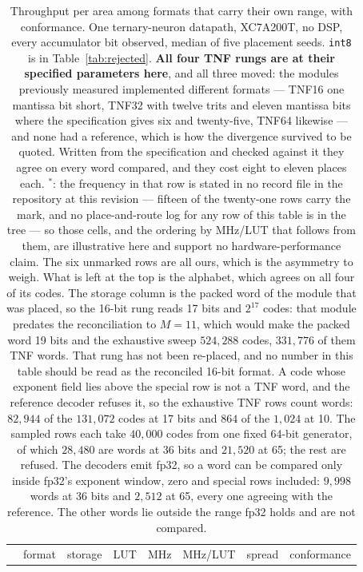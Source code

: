 \begin{table}[t]\centering
\caption{Throughput per area among formats that carry their own range, with
conformance. One ternary-neuron datapath, XC7A200T, no DSP, every accumulator
bit observed, median of five placement seeds. \texttt{int8} is in
Table~\ref{tab:rejected}. \textbf{All four TNF rungs are at their specified
parameters here}, and all three moved: the modules previously measured
implemented different formats --- TNF16 one mantissa bit short, TNF32 with twelve
trits and eleven mantissa bits where the specification gives six and
twenty-five, TNF64 likewise --- and none had a reference, which is how the
divergence survived to be quoted. Written from the specification and checked
against it they agree on every word compared, and they cost eight to eleven places
each. $^{\ast}$: the frequency in that row is stated in no record file in the
repository at this revision --- fifteen of the twenty-one rows carry the mark, and
no place-and-route log for any row of this table is in the tree --- so those cells,
and the ordering by MHz/LUT that follows from them, are illustrative here and
support no hardware-performance claim. The six unmarked rows are all ours, which
is the asymmetry to weigh. What is left at the top is the alphabet, which agrees on all four of its
codes. The storage column is the packed word of the module that was placed, so the
16-bit rung reads 17 bits and $2^{17}$ codes: that module predates the
reconciliation to $M = 11$, which would make the packed word 19 bits and the
exhaustive sweep $524{,}288$ codes, $331{,}776$ of them TNF words. That rung has
not been re-placed, and no number in this table should be read as the reconciled
16-bit format. A code whose exponent field lies above the special row is not a
TNF word, and the reference decoder refuses it, so the exhaustive TNF rows count
words: $82{,}944$ of the $131{,}072$ codes at 17 bits and $864$ of the $1{,}024$ at
10. The sampled rows each take $40{,}000$ codes from one fixed 64-bit generator, of which $28{,}480$ are words at 36 bits and $21{,}520$ at 65; the rest are refused. The decoders emit fp32, so a word can be compared only inside fp32's exponent window, zero and special rows included: $9{,}998$ words at 36 bits and $2{,}512$ at 65, every one agreeing with the reference. The other words lie outside the range fp32 holds and are not compared.}
\label{tab:fullthroughput}
\small\setlength{\tabcolsep}{4pt}
\begin{tabular}{rlrrrrrl}
\toprule
& format & storage & LUT & MHz & MHz/LUT & spread & conformance \\

\end{tabular}
\end{table}

